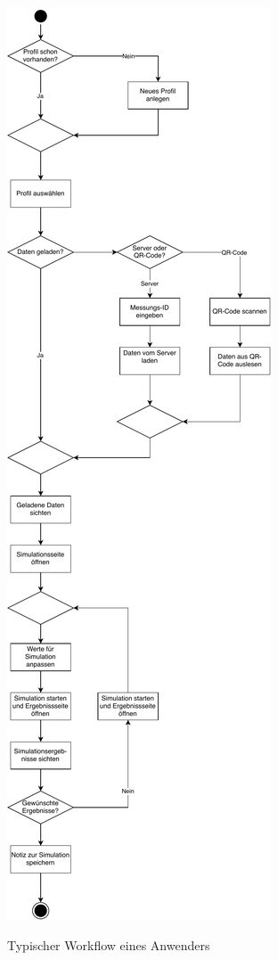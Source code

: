     	\begin{figure}[H]
    	\centering
   		\includegraphics[width=\textwidth,height=\textheight,keepaspectratio]{../include/images/workflow/workflow}
    	\label{img:workflow}
    	\caption{Typischer Workflow eines Anwenders}
    \end{figure}